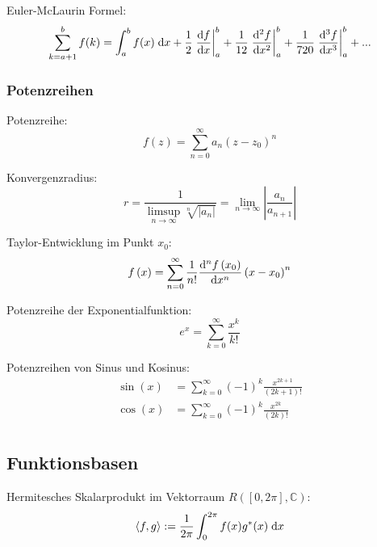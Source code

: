 			\noindent
			Euler-McLaurin Formel:
			\begin{equation}
				\sum_{k=a+1}^{b} f(k) = \int_{a}^{b}f(x) \;\mathrm{d} x
				+ \frac{1}{2} \left.\frac{\mathrm{d} f}{\mathrm{d} x} \right|_{a}^{b}
				+ \frac{1}{12}\left.\frac{\mathrm{d}^2 f}{\mathrm{d} x^2} \right|_{a}^{b}
				+ \frac{1}{720} \left.\frac{\mathrm{d}^3 f}{\mathrm{d} x^3} \right|_{a}^{b}
				+ ...
			\end{equation}

		\subsubsection{Potenzreihen}
			\noindent
			Potenzreihe:
			\begin{equation}
				f(z) = \sum_{n=0}^{\infty} a_n (z-z_0)^n
			\end{equation}

			\noindent
			Konvergenzradius:
			\begin{equation}
				r = \frac{1}{\limsup\limits_{n\rightarrow\infty} \sqrt[n]{\left|a_n\right|}} = \lim_{n\rightarrow\infty}\left|\frac{a_n}{a_{n+1}}\right|
			\end{equation}

			\noindent
			Taylor-Entwicklung im Punkt $x_0$:
			\begin{equation}
				f\left(x\right)=\sum_{n=0}^{\infty}\frac{1}{n!}\frac{\mathrm{d}^{n}f\left(x_0\right)}{\mathrm{d} x^{n}}\left(x-x_0\right)^{n}
			\end{equation}

			\noindent
			Potenzreihe der Exponentialfunktion:
			\begin{equation}
				e^x=\sum_{k=0}^{\infty}{\frac{x^k}{k!}}
			\end{equation}

			\noindent
			Potenzreihen von Sinus und Kosinus:
			\begin{equation}
				\begin{aligned}
					\sin(x) &= \sum_{k=0}^\infty (-1)^k \frac{x^{2k+1}}{(2k+1)!} \\
					\cos(x) &= \sum_{k=0}^\infty (-1)^k \frac{x^{2k}}{(2k)!} \\
				\end{aligned}
			\end{equation}

	\subsection{Funktionsbasen}
		\noindent
		Hermitesches Skalarprodukt im Vektorraum $R([0,2\pi],\mathbb{C})$:
		\begin{equation}
			\left<f,g\right>:=\frac{1}{2\pi}\int_0^{2\pi} f(x)g^* (x)\;\mathrm{d} x
		\end{equation}

